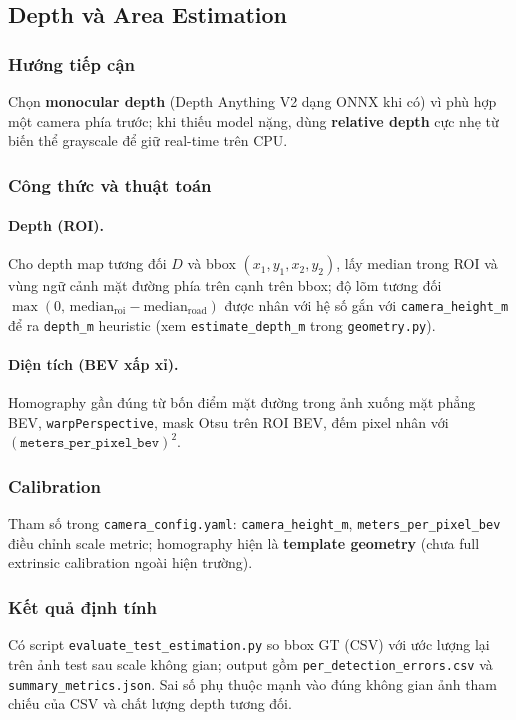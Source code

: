 \documentclass[12pt,a4paper]{article}
\begin{document}
\subsection{Depth và Area Estimation}
\subsubsection*{Hướng tiếp cận}
Chọn \textbf{monocular depth} (Depth Anything V2 dạng ONNX khi có) vì phù hợp một camera phía trước; khi thiếu model nặng, dùng \textbf{relative depth} cực nhẹ từ biến thể grayscale để giữ real-time trên CPU.

\subsubsection*{Công thức và thuật toán}
\paragraph{Depth (ROI).}
Cho depth map tương đối $D$ và bbox $(x_1,y_1,x_2,y_2)$, lấy median trong ROI và vùng ngữ cảnh mặt đường phía trên cạnh trên bbox; độ lõm tương đối $\max(0,\,\mathrm{median}_{\mathrm{roi}}-\mathrm{median}_{\mathrm{road}})$ được nhân với hệ số gắn với \texttt{camera\_height\_m} để ra \texttt{depth\_m} heuristic (xem \texttt{estimate\_depth\_m} trong \texttt{geometry.py}).

\paragraph{Diện tích (BEV xấp xỉ).}
Homography gần đúng từ bốn điểm mặt đường trong ảnh xuống mặt phẳng BEV, \texttt{warpPerspective}, mask Otsu trên ROI BEV, đếm pixel nhân với $(\texttt{meters\_per\_pixel\_bev})^2$.

\subsubsection*{Calibration}
Tham số trong \texttt{camera\_config.yaml}: \texttt{camera\_height\_m}, \texttt{meters\_per\_pixel\_bev} điều chỉnh scale metric; homography hiện là \textbf{template geometry} (chưa full extrinsic calibration ngoài hiện trường).

\subsubsection*{Kết quả định tính}
Có script \texttt{evaluate\_test\_estimation.py} so bbox GT (CSV) với ước lượng lại trên ảnh test sau scale không gian; output gồm \texttt{per\_detection\_errors.csv} và \texttt{summary\_metrics.json}. Sai số phụ thuộc mạnh vào đúng không gian ảnh tham chiếu của CSV và chất lượng depth tương đối.
\end{document}
